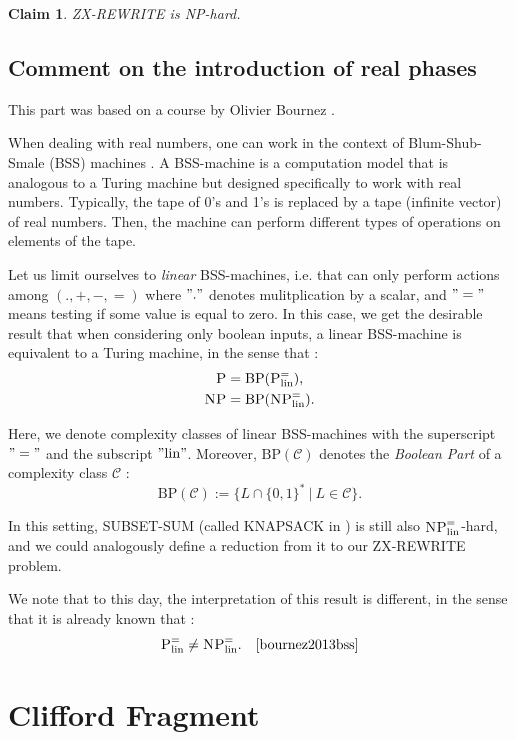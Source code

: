 \documentclass[journal,onecolumn]{IEEEtran}
\newtheorem{claim}[theorem]{Claim}
\begin{document}
\begin{claim}
	\textsc{ZX-REWRITE} is \textsc{NP}-hard.
\end{claim}

\subsection{Comment on the introduction of real phases}

This part was based on a course by Olivier Bournez \cite{bournez2013bss}.

When dealing with real numbers, one can work in the context of Blum-Shub-Smale (BSS) machines \cite{wiki:bss_machine}. A BSS-machine is a computation model that is analogous to a Turing machine but designed specifically to work with real numbers. Typically, the tape of 0's and 1's is replaced by a tape (infinite vector) of real numbers. Then, the machine can perform different types of operations on elements of the tape.

Let us limit ourselves to \textit{linear} BSS-machines, i.e. that can only perform actions among $(., +, -, =)$ where $"."$ denotes mulitplication by a scalar, and $"="$ means testing if some value is equal to zero. In this case, we get the desirable result that when considering only boolean inputs, a linear BSS-machine is equivalent to a Turing machine, in the sense that :
$$
\begin{aligned}
	\textsc{P} &= \text{BP}(\textsc{P}^=_\text{lin}),\\
	\textsc{NP} &= \text{BP}(\textsc{NP}^{=}_\text{lin}).
\end{aligned}
$$ 

Here, we denote complexity classes of linear BSS-machines with the superscript $"="$ and the subscript $"\text{lin}"$. Moreover, $\text{BP}(\mathcal{C})$ denotes the  \textit{Boolean Part} of a complexity class $\mathcal{C}$ :
$$
\text{BP}(\mathcal{C}) := \{L \cap \{0, 1\}^* \: | \: L \in \mathcal{C}\}.
$$

In this setting, \textsc{SUBSET-SUM} (called \textsc{KNAPSACK} in \cite{bournez2013bss}) is still also $\textsc{NP}^{=}_\text{lin}$-hard, and we could analogously define a reduction from it to our \textsc{ZX-REWRITE} problem.

We note that to this day, the interpretation of this result is different, in the sense that it is already known that :
$$
\textsc{P}^=_\text{lin} \neq \textsc{NP}^{=}_\text{lin}. \quad \cite{bournez2013bss}
$$ 

\section{Clifford Fragment}
\end{document}
